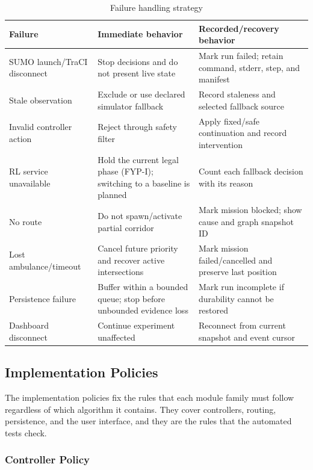 \begin{table}[htbp]
\centering
\caption{Failure handling strategy}
\label{tab:errors}
\begin{tabularx}{\textwidth}{p{}YY}
\toprule
\textbf{Failure} & \textbf{Immediate behavior} & \textbf{Recorded/recovery behavior}\\
\midrule
SUMO launch/TraCI disconnect & Stop decisions and do not present live state & Mark run failed; retain command, stderr, step, and manifest\\
Stale observation & Exclude or use declared simulator fallback & Record staleness and selected fallback source\\
Invalid controller action & Reject through safety filter & Apply fixed/safe continuation and record intervention\\
RL service unavailable & Hold the current legal phase (FYP-I); switching to a baseline is planned & Count each fallback decision with its reason\\
No route & Do not spawn/activate partial corridor & Mark mission blocked; show cause and graph snapshot ID\\
Lost ambulance/timeout & Cancel future priority and recover active intersections & Mark mission failed/cancelled and preserve last position\\
Persistence failure & Buffer within a bounded queue; stop before unbounded evidence loss & Mark run incomplete if durability cannot be restored\\
Dashboard disconnect & Continue experiment unaffected & Reconnect from current snapshot and event cursor\\
\bottomrule
\end{tabularx}
\end{table}

\subsection{Implementation Policies}

The implementation policies fix the rules that each module family must follow regardless of which algorithm it contains. They cover controllers, routing, persistence, and the user interface, and they are the rules that the automated tests check.

\subsubsection{Controller Policy}

